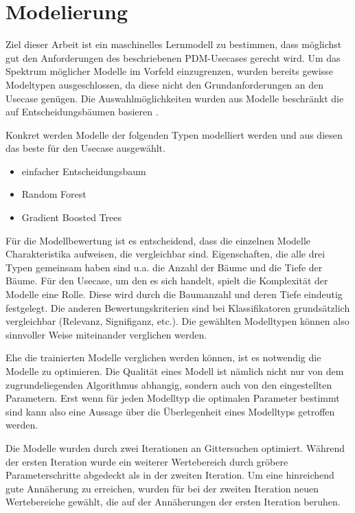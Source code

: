 \chapter{Modelierung}
\label{ch:modelierung}

Ziel dieser Arbeit ist ein maschinelles Lernmodell zu bestimmen, dass möglichst gut den Anforderungen des beschriebenen PDM-Usecases gerecht wird. Um das Spektrum möglicher Modelle im Vorfeld einzugrenzen, wurden bereits gewisse Modeltypen ausgeschlossen, da diese nicht den Grundanforderungen an den Usecase genügen. Die Auswahlmöglichkeiten wurden aus Modelle beschränkt die auf Entscheidungsbäumen basieren .

Konkret werden Modelle der folgenden Typen modelliert werden und aus diesen das beste für den Usecase ausgewählt.
\begin{itemize}
    \item einfacher Entscheidungsbaum
    \item Random Forest
    \item Gradient Boosted Trees
\end{itemize}

Für die Modellbewertung ist es entscheidend, dass die einzelnen Modelle Charakteristika aufweisen, die vergleichbar sind. Eigenschaften, die alle drei Typen gemeinsam haben sind u.a. die Anzahl der Bäume und die Tiefe der Bäume. Für den Usecase, um den es sich handelt, spielt die Komplexität der Modelle eine Rolle. Diese wird durch die Baumanzahl und deren Tiefe eindeutig festgelegt. Die anderen Bewertungskriterien sind bei Klassifikatoren grundsätzlich vergleichbar (Relevanz, Signifiganz, etc.).
Die gewählten Modelltypen können also sinnvoller Weise miteinander verglichen werden. 

Ehe die trainierten Modelle verglichen werden können, ist es notwendig die Modelle zu optimieren. Die Qualität eines Modell ist nämlich nicht nur von dem zugrundeliegenden Algorithmus abhangig, sondern auch von den eingestellten Parametern. Erst wenn für jeden Modelltyp die optimalen Parameter bestimmt sind kann also eine Aussage über die Überlegenheit eines Modelltyps getroffen werden.

Die Modelle wurden durch zwei Iterationen an Gittersuchen optimiert. Während der ersten Iteration wurde ein weiterer Wertebereich durch gröbere Parameterschritte abgedeckt als in der zweiten Iteration. Um eine hinreichend gute Annäherung zu erreichen, wurden für bei der zweiten Iteration neuen Wertebereiche gewählt, die auf der Annäherungen der ersten Iteration beruhen.

